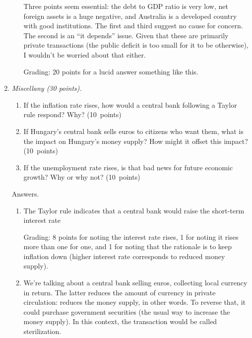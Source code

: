 \documentclass[letterpaper,12pt]{exam}
\begin{document}
\begin{enumerate}
\begin{enumerate}
Three points seem essential:  
the debt to GDP ratio is very low, 
net foreign assets is a huge negative,
and Australia  is a developed country with good institutions.  
The first and third suggest no cause for concern.  
The second is an ``it depends'' issue.  Given that these
are primarily private transactions 
(the public deficit is too small for it to be otherwise), 
I wouldn't be worried about that either.  

Grading:  20 points for a lucid answer something like this.  

\end{enumerate}


\item {\it Miscellany (30 points).}
%
\begin{enumerate} 

\item If the inflation rate rises, 
how would a central bank following a Taylor rule respond?  
Why?  
(10~points) 

\item If Hungary's central bank sells euros to citizens 
who want them,  
what is the impact on Hungary's money supply?  
How might it offset this impact?  
(10~points)

\item If the unemployment rate rises, 
is that bad news for future economic growth?  Why or why not?  
(10~points) 

\end{enumerate}

Answers.
\begin{enumerate}
\item The Taylor rule indicates that a central bank would raise 
the short-term interest rate

Grading:  8 points for noting the interest rate rises, 
1 for noting it rises more than one for one, 
and 1 for noting that the rationale is to keep inflation down 
(higher interest rate corresponds to reduced money supply).  

\item We're talking about a central bank selling euros, collecting
local currency in return.  The latter reduces the amount of currency
in private circulation:  reduces the money supply, in other words.  
To reverse that, it could purchase government securities 
(the usual way to increase the money supply).  
In this context, the transaction would be called sterilization. 


\end{enumerate}
\end{enumerate}
\end{document}
